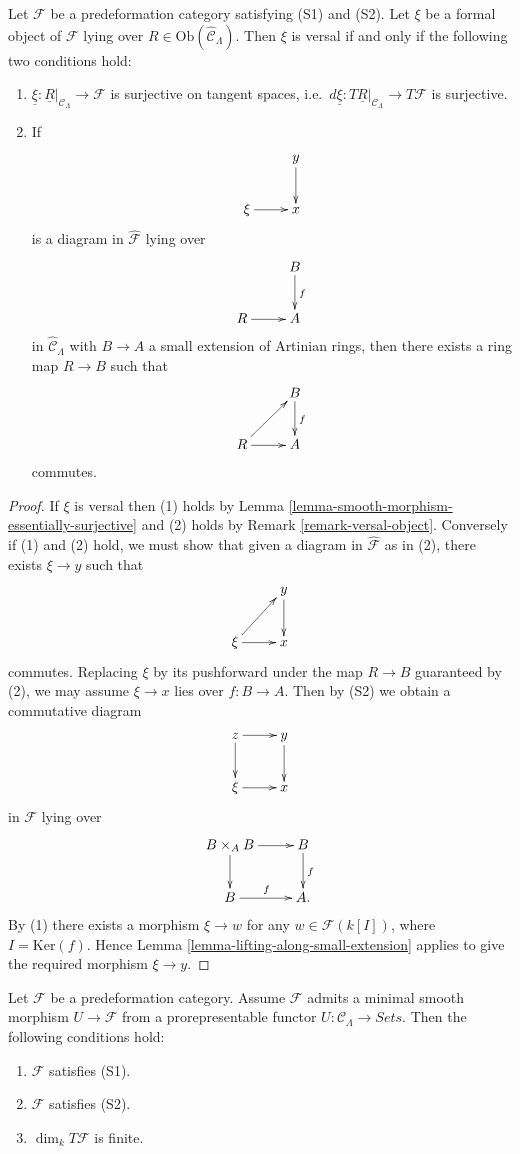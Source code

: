 \begin{lemma}
\label{lemma-versal-criterion}
Let $\mathcal{F}$ be a predeformation category satisfying (S1) and 
(S2).  Let $\xi$ be a formal object of $\mathcal{F}$ lying over $R 
\in \text{Ob}(\widehat{\mathcal{C}}_\Lambda)$.  Then $\xi$ is versal if 
and only if the following two conditions hold:
\begin{enumerate}
\item $\underline{\xi}: \underline{R}|_{\mathcal{C}_\Lambda} \to 
\mathcal{F}$ is surjective on tangent spaces, i.e.\ $d\underline{\xi}: T 
\underline{R}|_{\mathcal{C}_\Lambda} \to T\mathcal{F}$ is surjective.
\item If 
\[
\xymatrix{
            &  y \ar[d] \\
\xi \ar[r]  &  x
}
\]
is a diagram in $\widehat{\mathcal{F}}$ lying over
\[
\xymatrix{
         &   B  \ar[d]^{f} \\
R \ar[r] &   A 
}
\]
in $\widehat{\mathcal{C}}_\Lambda$ with $B \to A$ a small extension of 
Artinian rings, then there exists a ring map $R \to B$ such that
\[
\xymatrix{
         &   B  \ar[d]^{f} \\
R \ar[ur] \ar[r] &   A 
}
\]
commutes.
\end{enumerate}
\end{lemma}

\begin{proof}
If $\xi$ is versal then (1) holds by Lemma 
\ref{lemma-smooth-morphism-essentially-surjective} and (2) holds by Remark 
\ref{remark-versal-object}.  Conversely if (1) and (2) hold, we must show that 
given a diagram in $\widehat{\mathcal{F}}$ as in (2), there exists $\xi 
\to y$ such that
\[
\xymatrix{
            &  y \ar[d] \\
\xi \ar[ur] \ar[r]  &  x
}
\]
commutes. Replacing $\xi$ by its pushforward under the map $R \to B$ 
guaranteed by (2), we may assume $\xi \to x$ lies over $f: B 
\to A$.  Then by (S2) we obtain a commutative diagram
\[
\xymatrix{
z  \ar[r] \ar[d]          &  y \ar[d] \\
\xi \ar[r]  &  x
}
\]
in $\mathcal{F}$ lying over
\[
\xymatrix{
B \times_{A} B \ar[d] \ar[r] &   B  \ar[d]^{f} \\
B \ar[r]^{f} &   A .
}
\]
By (1) there exists a morphism $\xi \to w$ for any $w \in \mathcal 
F(k[I])$, where $I = \text{Ker}(f)$.  Hence Lemma 
\ref{lemma-lifting-along-small-extension} applies to give the required morphism 
$\xi \to y$. 
\end{proof}

\begin{lemma}
\label{lemma-miniversal-object-existence-1}
Let $\mathcal{F}$ be a predeformation category.  Assume $\mathcal{F}$ admits a 
minimal smooth morphism $U \to \mathcal{F}$ from a prorepresentable 
functor $U: \mathcal{C}_\Lambda \to \textit{Sets}$.  Then the 
following conditions hold:
\begin{enumerate}
\item $\mathcal{F}$ satisfies (S1).
\item $\mathcal{F}$ satisfies (S2).
\item $\dim_{k} T\mathcal{F}$ is finite.
\end{enumerate}
\end{lemma}

